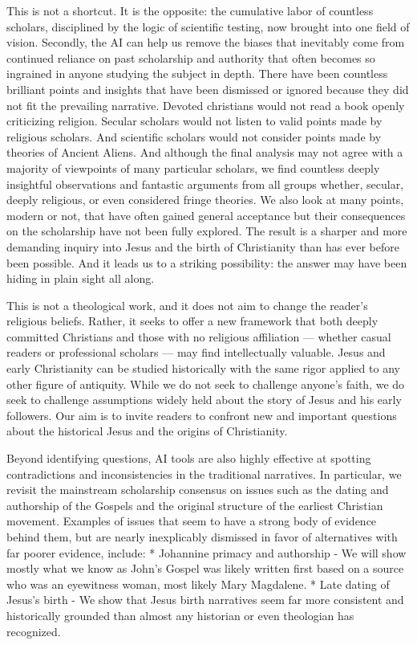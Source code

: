 This is not a shortcut.
It is the opposite: the cumulative labor of countless scholars, disciplined by the logic of scientific testing, now brought into one field of vision.
Secondly, the AI can help us remove the biases that inevitably come from continued reliance on past scholarship and authority that often becomes so ingrained in anyone studying the subject in depth.
There have been countless brilliant points and insights that have been dismissed or ignored because they did not fit the prevailing narrative.
Devoted christians would not read a book openly criticizing religion.
Secular scholars would not listen to valid points made by religious scholars.
And scientific scholars would not consider points made by theories of Ancient Aliens.
And although the final analysis may not agree with a majority of viewpoints of many particular scholars, we find countless deeply insightful observations and fantastic arguments from all groups whether, secular, deeply religious, or even considered fringe theories.
We also look at many points, modern or not, that have often gained general acceptance but their consequences on the scholarship have not been fully explored.
The result is a sharper and more demanding inquiry into Jesus and the birth of Christianity than has ever before been possible.
And it leads us to a striking possibility: the answer may have been hiding in plain sight all along.

This is not a theological work, and it does not aim to change the reader’s religious beliefs.
Rather, it seeks to offer a new framework that both deeply committed Christians and those with no religious affiliation — whether casual readers or professional scholars — may find intellectually valuable.
Jesus and early Christianity can be studied historically with the same rigor applied to any other figure of antiquity.
While we do not seek to challenge anyone’s faith, we do seek to challenge assumptions widely held about the story of Jesus and his early followers.
Our aim is to invite readers to confront new and important questions about the historical Jesus and the origins of Christianity.

Beyond identifying questions, AI tools are also highly effective at spotting contradictions and inconsistencies in the traditional narratives.
In particular, we revisit the mainstream scholarship consensus on issues such as the dating and authorship of the Gospels and the original structure of the earliest Christian movement.
Examples of issues that seem to have a strong body of evidence behind them, but are nearly inexplicably dismissed in favor of alternatives with far poorer evidence, include:
* Johannine primacy and authorship - We will show mostly what we know as John's Gospel was likely written first based on a source who was an eyewitness woman, most likely Mary Magdalene.
* Late dating of Jesus’s birth - We show that Jesus birth narratives seem far more consistent and historically grounded than almost any historian or even theologian has recognized.

